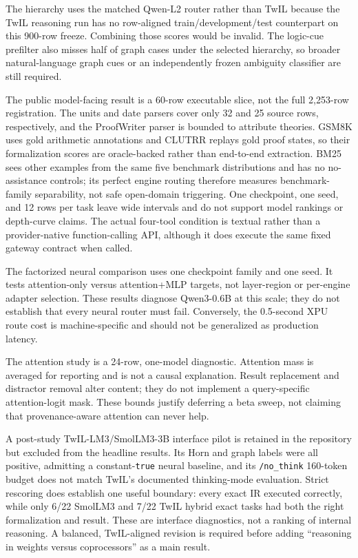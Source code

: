 \documentclass[10pt]{article}
\begin{document}
The hierarchy uses the matched Qwen-L2 router rather than TwIL because the TwIL
reasoning run has no row-aligned train/development/test counterpart on this
900-row freeze. Combining those scores would be invalid. The logic-cue prefilter
also misses half of graph cases under the selected hierarchy, so broader
natural-language graph cues or an independently frozen ambiguity classifier are
still required.

The public model-facing result is a 60-row executable slice, not the full
2,253-row registration.  The units and date parsers cover only 32 and 25 source
rows, respectively, and the ProofWriter parser is bounded to attribute theories.
GSM8K uses gold arithmetic annotations and CLUTRR replays gold proof states, so
their formalization scores are oracle-backed rather than end-to-end extraction.
BM25 sees other examples from the same five benchmark distributions and has no
no-assistance controls; its perfect engine routing therefore measures
benchmark-family separability, not safe open-domain triggering.  One checkpoint,
one seed, and 12 rows per task leave wide intervals and do not support model
rankings or depth-curve claims.  The actual four-tool condition is textual rather
than a provider-native function-calling API, although it does execute the same
fixed gateway contract when called.

The factorized neural comparison uses one checkpoint family and one seed.  It
tests attention-only versus attention+MLP targets, not layer-region or per-engine
adapter selection.  These results diagnose Qwen3-0.6B at this scale; they do not
establish that every neural router must fail.  Conversely, the 0.5-second XPU
route cost is machine-specific and should not be generalized as production
latency.

The attention study is a 24-row, one-model diagnostic.  Attention mass is
averaged for reporting and is not a causal explanation.  Result replacement and
distractor removal alter content; they do not implement a query-specific
attention-logit mask.  These bounds justify deferring a beta sweep, not claiming
that provenance-aware attention can never help.

A post-study TwIL-LM3/SmolLM3-3B interface pilot is retained in the repository
but excluded from the headline results.  Its Horn and graph labels were all
positive, admitting a constant-\texttt{true} neural baseline, and its
\texttt{/no\_think} 160-token budget does not match TwIL's documented
thinking-mode evaluation.  Strict rescoring does establish one useful boundary:
every exact IR executed correctly, while only 6/22 SmolLM3 and 7/22 TwIL hybrid
exact tasks had both the right formalization and result.  These are interface
diagnostics, not a ranking of internal reasoning.  A balanced, TwIL-aligned
revision is required before adding ``reasoning in weights versus coprocessors''
as a main result.
\end{document}
